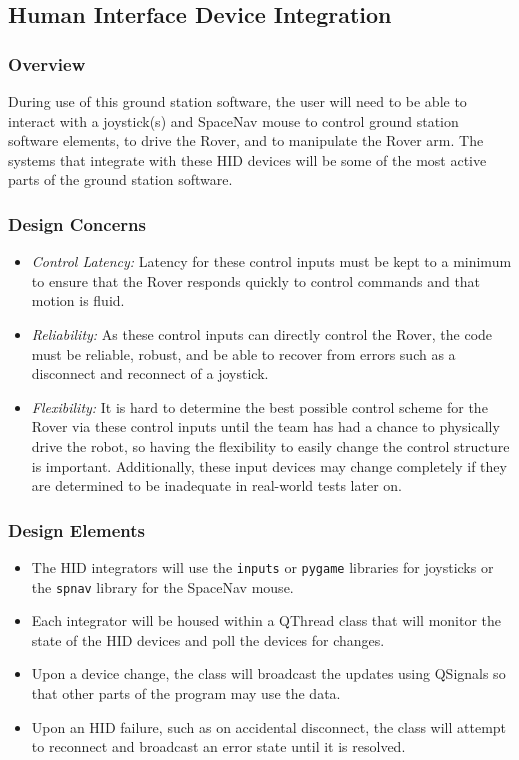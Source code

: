 \subsection{Human Interface Device Integration}
\subsubsection{Overview}
During use of this ground station software, the user will need to be able to interact with a joystick(s) and SpaceNav mouse to control ground station software elements, to drive the Rover, and to manipulate the Rover arm.
The systems that integrate with these HID devices will be some of the most active parts of the ground station software.

\subsubsection{Design Concerns}
\begin{itemize}
\item \textit{Control Latency:} Latency for these control inputs must be kept to a minimum to ensure that the Rover responds quickly to control commands and that motion is fluid.
\item \textit{Reliability:} As these control inputs can directly control the Rover, the code must be reliable, robust, and be able to recover from errors such as a disconnect and reconnect of a joystick.
\item \textit{Flexibility:} It is hard to determine the best possible control scheme for the Rover via these control inputs until the team has had a chance to physically drive the robot, so having the flexibility to easily change the control structure is important.
Additionally, these input devices may change completely if they are determined to be inadequate in real-world tests later on.
\end{itemize}

\subsubsection{Design Elements}
\begin{itemize}
\item The HID integrators will use the \texttt{inputs} or \texttt{pygame} libraries for joysticks or the \texttt{spnav} library for the SpaceNav mouse.
\item Each integrator will be housed within a QThread class that will monitor the state of the HID devices and poll the devices for changes.
\item Upon a device change, the class will broadcast the updates using QSignals so that other parts of the program may use the data.
\item Upon an HID failure, such as on accidental disconnect, the class will attempt to reconnect and broadcast an error state until it is resolved.
\end{itemize}

